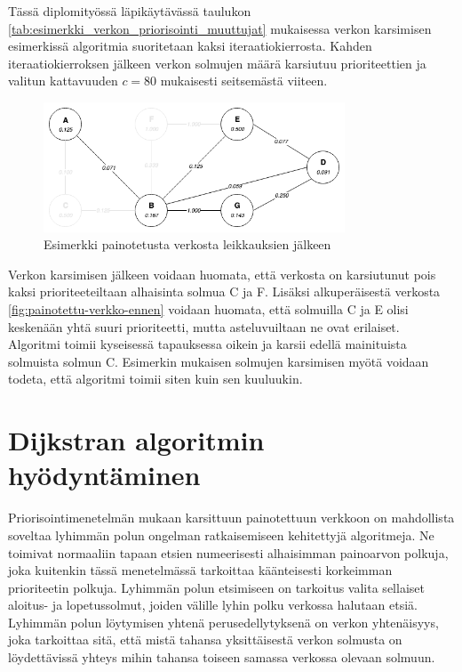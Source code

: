   Tässä diplomityössä läpikäytävässä taulukon \ref{tab:esimerkki_verkon_priorisointi_muuttujat} mukaisessa verkon karsimisen esimerkissä algoritmia suoritetaan kaksi iteraatiokierrosta.
  Kahden iteraatiokierroksen jälkeen verkon solmujen määrä karsiutuu prioriteettien ja valitun kattavuuden \(c=80\) mukaisesti seitsemästä viiteen.

  \begin{figure}[H]
    \centering
    \includegraphics[width=0.8\textwidth]{assets/painotettu-verkko-jalkeen.png}
    \caption{Esimerkki painotetusta verkosta leikkauksien jälkeen}
    \label{fig:painotettu-verkko-jalkeen}
  \end{figure}

  Verkon karsimisen jälkeen voidaan huomata, että verkosta on karsiutunut pois kaksi prioriteeteiltaan alhaisinta solmua C ja F.
  Lisäksi alkuperäisestä verkosta \ref{fig:painotettu-verkko-ennen} voidaan huomata, että solmuilla C ja E olisi keskenään yhtä suuri prioriteetti, mutta asteluvuiltaan ne ovat erilaiset.
  Algoritmi toimii kyseisessä tapauksessa oikein ja karsii edellä mainituista solmuista solmun C.
  Esimerkin mukaisen solmujen karsimisen myötä voidaan todeta, että algoritmi toimii siten kuin sen kuuluukin.

\section{Dijkstran algoritmin hyödyntäminen} \label{ch:10_dijkstran_algoritmin_hyodyntaminen}

  Priorisointimenetelmän mukaan karsittuun painotettuun verkkoon on mahdollista soveltaa lyhimmän polun ongelman ratkaisemiseen kehitettyjä algoritmeja.
  Ne toimivat normaaliin tapaan etsien numeerisesti alhaisimman painoarvon polkuja, joka kuitenkin tässä menetelmässä tarkoittaa käänteisesti korkeimman prioriteetin polkuja.
  Lyhimmän polun etsimiseen on tarkoitus valita sellaiset aloitus- ja lopetussolmut, joiden välille lyhin polku verkossa halutaan etsiä.
  Lyhimmän polun löytymisen yhtenä perusedellytyksenä on verkon yhtenäisyys, joka tarkoittaa sitä, että mistä tahansa yksittäisestä verkon solmusta on löydettävissä yhteys mihin tahansa toiseen samassa verkossa olevaan solmuun.

